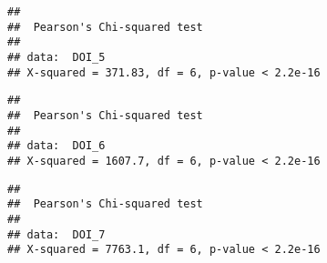 \documentclass[
]{article}
\newenvironment{Shaded}{\begin{snugshade}}{\end{snugshade}}
\newcommand{\DataTypeTok}[1]{\textcolor[rgb]{0.13,0.29,0.53}{#1}}
\newcommand{\DecValTok}[1]{\textcolor[rgb]{0.00,0.00,0.81}{#1}}
\newcommand{\KeywordTok}[1]{\textcolor[rgb]{0.13,0.29,0.53}{\textbf{#1}}}
\newcommand{\NormalTok}[1]{#1}
\newcommand{\OperatorTok}[1]{\textcolor[rgb]{0.81,0.36,0.00}{\textbf{#1}}}
\newcommand{\OtherTok}[1]{\textcolor[rgb]{0.56,0.35,0.01}{#1}}
\begin{document}
\begin{Shaded}
\end{Shaded}

\begin{verbatim}
## 
##  Pearson's Chi-squared test
## 
## data:  DOI_5
## X-squared = 371.83, df = 6, p-value < 2.2e-16
\end{verbatim}

\begin{Shaded}
\end{Shaded}

\begin{verbatim}
## 
##  Pearson's Chi-squared test
## 
## data:  DOI_6
## X-squared = 1607.7, df = 6, p-value < 2.2e-16
\end{verbatim}

\begin{Shaded}
\end{Shaded}

\begin{verbatim}
## 
##  Pearson's Chi-squared test
## 
## data:  DOI_7
## X-squared = 7763.1, df = 6, p-value < 2.2e-16
\end{verbatim}

\begin{Shaded}
\end{Shaded}
\end{document}
